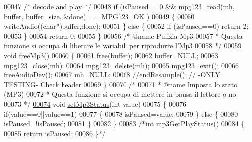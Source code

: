 \begin{DoxyCode}
00047     \textcolor{comment}{/* decode and play */}
00048     \textcolor{keywordflow}{if} (isPaused==0 && mpg123\_read(mh, buffer, buffer\_size, &done) == MPG123\_OK
      )
00049     \{
00050         writeAudio((\textcolor{keywordtype}{char}*)buffer,done);
00051     \} \textcolor{keywordflow}{else} \{
00052         \textcolor{keywordflow}{if} (isPaused==0) \textcolor{keywordflow}{return} 2;
00053     \}
00054     \textcolor{keywordflow}{return} 0;
00055 \}
00056 \textcolor{comment}{/* @name Pulizia Mp3}
00057 \textcolor{comment}{ * Questa funzione si occupa di liberare le variabili per riprodurre l'Mp3}
00058 \textcolor{comment}{ */}
\hypertarget{mpg123_8c_source_l00059}{}\hyperlink{mpg123_8h_ad8bff7d817bc1b5f8c1ab8388158bc29}{00059} \textcolor{keywordtype}{void} \hyperlink{mpg123_8c_ad8bff7d817bc1b5f8c1ab8388158bc29}{freeMp3}()
00060 \{
00061     free(buffer);
00062     buffer=NULL;
00063     mpg123\_close(mh);
00064     mpg123\_delete(mh);
00065     mpg123\_exit();
00066     freeAudioDev();
00067     mh=NULL;
00068     \textcolor{comment}{//endResample(); // -ONLY TESTING- Check header}
00069 \}
00070 \textcolor{comment}{/*}
00071 \textcolor{comment}{ * @name Imposta lo stato (MP3)}
00072 \textcolor{comment}{ * Questa funzione si occupa di mettere in pausa il lettore o no}
00073 \textcolor{comment}{ */}
\hypertarget{mpg123_8c_source_l00074}{}\hyperlink{mpg123_8h_a852896f3beba9503ee018f0a1bdf28ea}{00074} \textcolor{keywordtype}{void} \hyperlink{mpg123_8c_a852896f3beba9503ee018f0a1bdf28ea}{setMp3Status}(\textcolor{keywordtype}{int} value)
00075 \{
00076     \textcolor{keywordflow}{if}(value==0||value==1)
00077     \{
00078         isPaused=value;
00079     \} \textcolor{keywordflow}{else} \{
00080         isPaused=!isPaused;
00081     \}
00082 \}
00083 \textcolor{comment}{/*int mp3GetPlayStatus()}
00084 \textcolor{comment}{\{}
00085 \textcolor{comment}{    return isPaused;}
00086 \textcolor{comment}{\}*/}
\end{DoxyCode}
